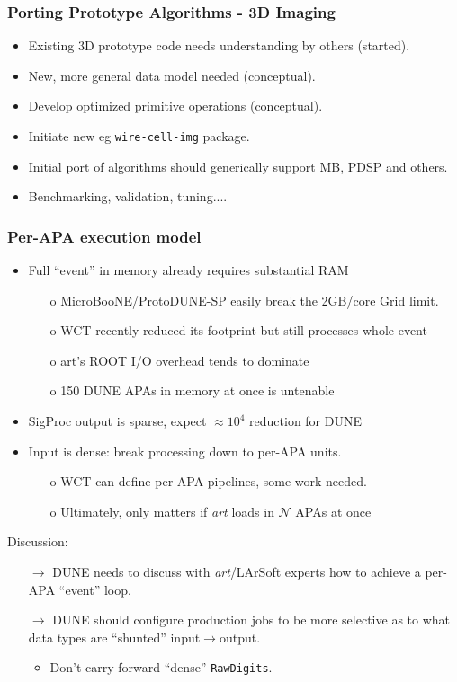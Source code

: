 \documentclass[xcolor=dvipsnames]{beamer}
\begin{document}
\begin{frame}
  \frametitle{Porting Prototype Algorithms - 3D Imaging}

  \begin{itemize}
  \item Existing 3D prototype code needs understanding by others (started).
  \item New, more general data model needed (conceptual).
  \item Develop optimized primitive operations (conceptual).
  \item Initiate new eg \texttt{wire-cell-img} package.
  \item Initial port of algorithms should generically support MB, PDSP and others.
  \item Benchmarking, validation, tuning....
  \end{itemize}
  
\end{frame}


\begin{frame}
  \frametitle{Per-APA execution model}
  \begin{itemize}
  \item Full ``event'' in memory already requires substantial RAM
    \begin{itemize}\footnotesize
    \item[o] MicroBooNE/ProtoDUNE-SP easily break the 2GB/core Grid limit.
    \item[o] WCT recently reduced its footprint but still processes whole-event
    \item[o] art's ROOT I/O overhead tends to dominate
    \item[o] 150 DUNE APAs in memory at once is untenable
    \end{itemize}
  \item SigProc output is sparse, expect $\approx10^4$ reduction for DUNE
  \item Input is dense: break processing down to per-APA units.
    \begin{itemize}\footnotesize
    \item[o] WCT can define per-APA pipelines, some work needed.
    \item[o] Ultimately, only matters if \textit{art} loads in $\mathcal{N}$ APAs at once
    \end{itemize}
  \end{itemize}

  Discussion:
  \begin{itemize}\footnotesize
  \item[$\to$] DUNE needs to discuss with \textit{art}/LArSoft experts how to achieve a per-APA ``event'' loop. 
  \item[$\to$] DUNE should configure production jobs to be more selective as to what data types are ``shunted'' input$\to$output.
    \begin{itemize}\scriptsize
    \item Don't carry forward ``dense'' \texttt{RawDigits}.
    \end{itemize}
  \end{itemize}
\end{frame}
\end{document}
